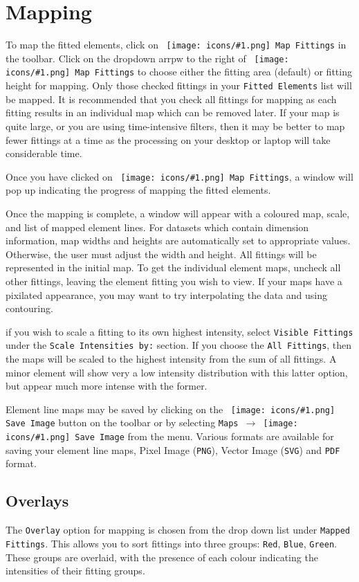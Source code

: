 \documentclass[article,11pt]{report}
\newcommand{\command}[1]{\texttt{#1}}
\newcommand{\icon}[1]{\texttt{[image: icons/\#1.png]}}
\newcommand{\button}[2]{\ \command{\icon{#1} #2}}
\newcommand{\menu}[0]{$\rightarrow$}
\newcommand{\tocchapter}[1]{\chapter*{#1}\addcontentsline{toc}{chapter}{#1}}
\newcommand{\tocsection}[1]{\section*{#1}\addcontentsline{toc}{section}{#1}}
\begin{document}
\tocchapter{Mapping}

To map the fitted elements, click on \button{map}{Map Fittings} in the toolbar. 
Click on the dropdown arrpw to the right of \button{map}{Map Fittings} to choose either the
fitting area (default) or fitting height for mapping. Only those checked fittings in your
\command{Fitted Elements} list will be mapped. It is recommended that you check all
fittings for mapping as each fitting results in an individual map which can be removed 
later. If your map is quite large, or you are using time-intensive filters, then it 
may be better to map fewer fittings at a time as the processing on your desktop or 
laptop will take considerable time.

Once you have clicked on \button{map}{Map Fittings}, a window will pop up indicating the
progress of mapping the fitted elements.

Once the mapping is complete, a window will appear with a coloured map, scale, and 
list of mapped element lines. For datasets which contain dimension information, map 
widths and heights are automatically set to appropriate values. Otherwise, the user 
must adjust the width and height. All fittings will be represented in the initial map. 
To get the individual element maps, uncheck all other fittings, leaving the element 
fitting you wish to view. If your maps have a pixilated appearance, you may want to 
try interpolating the data and using contouring.

if you wish to scale a fitting to its own highest intensity, select \command{Visible Fittings}
under the \command{Scale Intensities by:} section. If you choose the 
\command{All Fittings}, then the maps will be scaled to the highest intensity from 
the sum of all fittings. A minor element will show very a low intensity 
distribution with this latter option, but appear much more intense with the former.

Element line maps may be saved by clicking on the \button{device-camera}{Save Image} 
button on the toolbar or by selecting \command{Maps \menu\button{device-camera}{Save Image}}
from the menu. Various formats are available for saving your element line maps, 
Pixel Image (\command{PNG}), Vector Image (\command{SVG}) and \command{PDF} format.


\tocsection{Overlays}

The \command{Overlay} option for mapping is chosen from the drop down list under 
\command{Mapped Fittings}. This allows you to sort fittings into three groups: 
\command{Red}, \command{Blue}, \command{Green}. These groups are overlaid, with the
presence of each colour indicating the intensities of their fitting groups.
\end{document}
